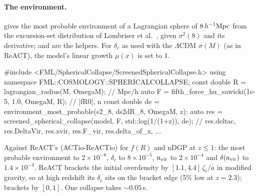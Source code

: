 \paragraph*{The environment.}  gives the most probable environment of a Lagrangian sphere of
$8\,h^{-1}\mathrm{Mpc}$ from the excursion-set distribution of Lombriser et al.\ \cite{Lombriser2014}, given $\sigma^2(8)$ and its
derivative;  and  are the helpers. For $\delta_c$ as used with
the $\Lambda$CDM $\sigma(M)$ (as in ReACT), the model's linear growth $\mu(x)$ is set to 1.

\begin{cppcode}
#include <FML/SphericalCollapse/ScreenedSphericalCollapse.h>
using namespace FML::COSMOLOGY::SPHERICALCOLLAPSE;
const double R  = lagrangian_radius(M, OmegaM);                 // Mpc/h
auto F          = fifth_force_hu_sawicki(1e-5, 1.0, OmegaM, R); // |fR0|, n
const double de = environment_most_probable(s2_8, ds2dR_8, OmegaM, z);
auto res = screened_spherical_collapse(model, F, std::log(1/(1+z)), de);
// res.deltac, res.DeltaVir, res.xvir, res.F_vir, res.delta_of_x, ...
\end{cppcode}

\begin{validation}
Against ReACT's  (ACTio-ReACTio) for $f(R)$ and nDGP at $z\le1$: the most probable environment to
$2\times10^{-6}$, $\delta_c$ to $8\times10^{-5}$, $a_{\rm vir}$ to $2\times10^{-4}$ and $\delta(a_{\rm vir})$ to
$1.4\times10^{-3}$. ReACT brackets the initial overdensity by $[1.1,4.4]\,\zeta_i/a$ in modified gravity, so at high
redshift its $\delta_c$ sits on the bracket edge (5\% low at $z=2.3$); \fml{} brackets by $[0,1]$. One collapse takes
$\sim0.05$\,s.
\end{validation}
